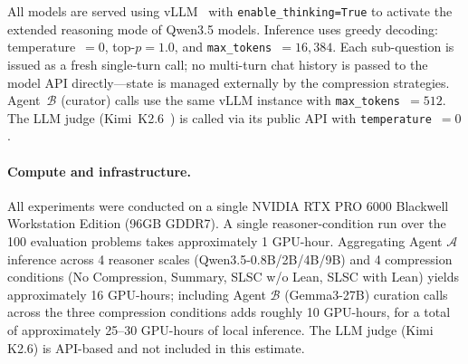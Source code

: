 All models are served using vLLM~\citep{kwon2023efficient} with \texttt{enable\_thinking=True} to activate the extended reasoning mode of Qwen3.5 models. Inference uses greedy decoding: temperature~$= 0$, top-$p = 1.0$, and \texttt{max\_tokens}~$= 16{,}384$. Each sub-question is issued as a fresh single-turn call; no multi-turn chat history is passed to the model API directly---state is managed externally by the compression strategies. Agent~$\mathcal{B}$ (curator) calls use the same vLLM instance with \texttt{max\_tokens}~$= 512$. The LLM judge (Kimi~K2.6~\citep{moonshotai2026kimik26}) is called via its public API with \texttt{temperature}~$= 0$.

\paragraph{Compute and infrastructure.}
All experiments were conducted on a single NVIDIA RTX PRO 6000
Blackwell Workstation Edition (96GB GDDR7). A single
reasoner-condition run over the 100 evaluation problems takes
approximately 1 GPU-hour. Aggregating Agent $\mathcal{A}$
inference across 4 reasoner scales (Qwen3.5-0.8B/2B/4B/9B) and
4 compression conditions (No Compression, Summary, SLSC w/o Lean,
SLSC with Lean) yields approximately 16 GPU-hours; including
Agent $\mathcal{B}$ (Gemma3-27B) curation calls across the three
compression conditions adds roughly 10 GPU-hours, for a total of
approximately 25--30 GPU-hours of local inference. The LLM judge
(Kimi K2.6) is API-based and not included in this estimate.
